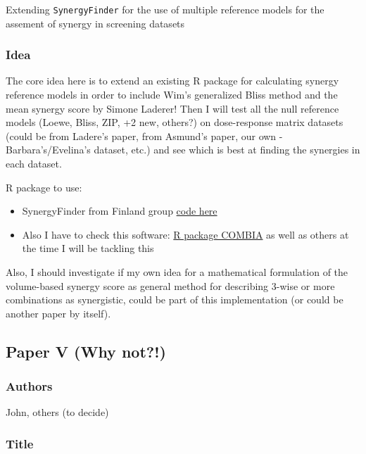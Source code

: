 \documentclass[12pt,]{book}
\providecommand{\tightlist}{%
  \setlength{\itemsep}{0pt}\setlength{\parskip}{0pt}}
\begin{document}
Extending \texttt{SynergyFinder} for the use of multiple reference models for the assement of synergy in screening datasets

\hypertarget{idea-2}{%
\subsubsection*{Idea}\label{idea-2}}

The core idea here is to extend an existing R package for calculating synergy
reference models in order to include Wim's generalized Bliss method and the mean synergy score by Simone Laderer! Then I will test all the null reference models (Loewe, Bliss, ZIP, +2 new, others?) on dose-response matrix datasets (could be from Ladere's paper, from Asmund's paper, our own - Barbara's/Evelina's dataset, etc.) and see which is best at finding the synergies in each dataset.

R package to use:

\begin{itemize}
\tightlist
\item
  SynergyFinder from Finland group \href{https://github.com/google/synergyfinderengineered/}{code here}
\item
  Also I have to check this software: \href{https://www.ncbi.nlm.nih.gov/pmc/articles/PMC5732778/}{R package COMBIA} as well as others at the time I will be tackling this
\end{itemize}

Also, I should investigate if my own idea for a mathematical
formulation of the volume-based synergy score as general method for describing 3-wise
or more combinations as synergistic, could be part of this implementation (or could be another paper by itself).

\hypertarget{paper-v-why-not}{%
\subsection*{Paper V (Why not?!)}\label{paper-v-why-not}}

\hypertarget{authors-3}{%
\subsubsection*{Authors}\label{authors-3}}

John, others (to decide)

\hypertarget{title-1}{%
\subsubsection*{Title}\label{title-1}}
\end{document}

